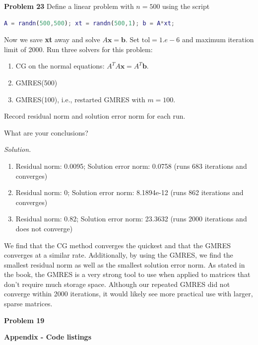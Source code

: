 \documentclass[12pt]{article}
\newcommand{\problem}[1]{\hspace{-4 ex} \large \textbf{Problem #1} }
\newcommand{\solution}{\vspace{2 ex} \hspace{-5 ex} \emph{Solution.} }
\begin{document}
\bigbreak

\problem{23} Define a linear problem with $ n = 500 $ using the script
\begin{lstlisting}[language=MATLAB]
A = randn(500,500); xt = randn(500,1); b = A*xt;
\end{lstlisting}
Now we save \textbf{xt} away and solve $ A\textbf{x} = \textbf{b} $. Set $ \text{tol} = 1.e-6 $ and maximum iteration limit of 2000. Run three solvers for this problem:
\begin{enumerate}[leftmargin=0.6cm,label=(\alph*)]
	\item CG on the normal equations: $ A^TA\textbf{x} = A^T\textbf{b} $.
	\item GMRES(500)
	\item GMRES(100), i.e., restarted GMRES with $ m = 100 $. 
\end{enumerate}
Record residual norm and solution error norm for each run.

What are your conclusions?

\solution
\begin{enumerate}[leftmargin=0.6cm,label=(\alph*)]
	\item Residual norm: 0.0095; Solution error norm: 0.0758 (runs 683 iterations and converges)
	\item Residual norm: 0; Solution error norm: 8.1894e-12 (runs 862 iterations and converges)
	\item Residual norm: 0.82; Solution error norm: 23.3632 (runs 2000 iterations and does not converge)
\end{enumerate}
We find that the CG method converges the quickest and that the GMRES converges at a similar rate. Additionally, by using the GMRES, we find the smallest residual norm as well as the smallest solution error norm. As stated in the book, the GMRES is a very strong tool to use when applied to matrices that don't require much storage space. Although our repeated GMRES did not converge within 2000 iterations, it would likely see more practical use with larger, sparse matrices. 


\bigbreak

\problem{19}



\bigbreak

{\hspace{-4 ex} \huge \textbf{Appendix - Code listings}}\bigbreak
\end{document}
